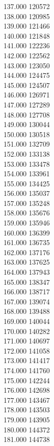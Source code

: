 { 137.000	120572 \\
 138.000	120985 \\
 139.000	121466 \\
 140.000	121848 \\
 141.000	122236 \\
 142.000	122562 \\
 143.000	123050 \\
 144.000	124475 \\
 145.000	124507 \\
 146.000	126971 \\
 147.000	127289 \\
 148.000	127708 \\
 149.000	130044 \\
 150.000	130518 \\
 151.000	132709 \\
 152.000	133138 \\
 153.000	133478 \\
 154.000	133961 \\
 155.000	134425 \\
 156.000	135037 \\
 157.000	135248 \\
 158.000	135676 \\
 159.000	135946 \\
 160.000	136399 \\
 161.000	136735 \\
 162.000	137176 \\
 163.000	137625 \\
 164.000	137943 \\
 165.000	138347 \\
 166.000	138717 \\
 167.000	139074 \\
 168.000	139488 \\
 169.000	140044 \\
 170.000	140282 \\
 171.000	140697 \\
 172.000	141058 \\
 173.000	141417 \\
 174.000	141760 \\
 175.000	142244 \\
 176.000	142698 \\
 177.000	143467 \\
 178.000	143503 \\
 179.000	143905 \\
 180.000	144372 \\
 181.000	144738 \\
}
